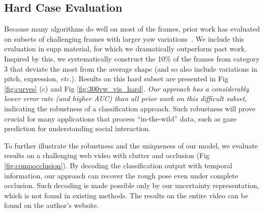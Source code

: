 \documentclass[letterpaper]{article} %
\newcommand{\etc}{\textit{etc.}}
\begin{document}
\subsection{Hard Case Evaluation}
Because many algorithms do well on most of the frames, prior work has evaluated on subsets of challenging frames with larger yaw variations~\cite{Zhu2016FaceAA}. We include this evaluation in supp material, for which we dramatically outperform past work. Inspired by this, we systematically construct the 10\% of the frames from category 3 that deviate the most from the average shape (and so also include variations in pitch, expression, \etc). Results on this hard subset are presented in Fig \ref{fig:curves} (c) and Fig \ref{fig:300vw_vis_hard}. {\em Our approach has a considerably lower error rate (and higher AUC) than all prior work on this difficult subset}, indicating the robustness of a classification approach. Such robustness will prove crucial for many applications that process ``in-the-wild'' data, such as gaze prediction for understanding social interaction.

To further illustrate the robustness and the uniqueness of our model, we evaluate results on a challenging web video with clutter and occlusion (Fig \ref{fig:compocclusion}). By decoding the classification output with temporal information, our approach can recover the rough pose even under complete occlusion. Such decoding is made possible only by our uncertainty representation, which is not found in existing methods. 
The results on the entire video can be found on the author's website.
\end{document}
